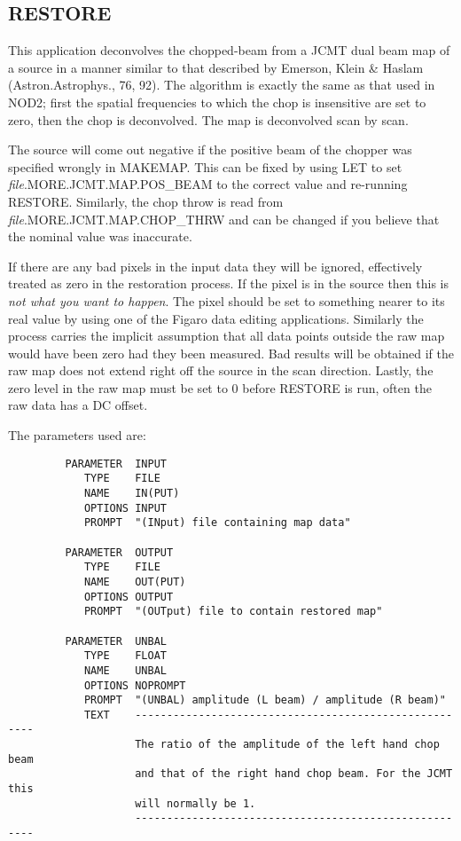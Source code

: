 \subsection{RESTORE}

This application deconvolves the chopped-beam from a JCMT dual  beam
map of a source in a manner similar to that described by  Emerson,
Klein \& Haslam (Astron.Astrophys., 76, 92). The algorithm  is exactly
the same as that used in NOD2; first the spatial  frequencies to which
the chop is insensitive are set to zero,  then the chop is
deconvolved. The map is deconvolved scan by scan.

The source will come out negative if the positive beam of the chopper
was specified wrongly in MAKEMAP. This can be fixed by using LET to
set {\em file}.MORE.JCMT.MAP.POS\_BEAM to the correct value and
re-running RESTORE. Similarly, the chop throw  is read from {\em
file}.MORE.\-JCMT.\-MAP.CHOP\_THRW and can be changed if you  believe that
the nominal value was inaccurate.

If there are any bad pixels in the input data they will be ignored,
effectively treated as zero in the restoration process. If the pixel
is in the source then this is {\em not what you want to happen}. The
pixel should be set to something nearer to its real value by using one
of the Figaro data editing applications. Similarly  the process
carries the implicit assumption that all data points outside the raw
map would have been zero had they been measured. Bad results will be
obtained if the raw map does not extend right off the source in the
scan direction. Lastly, the zero level in the raw map must be set to 0
before RESTORE is run, often the raw data has a DC offset.

The parameters used are:

\begin{small}
\begin{verbatim}
         PARAMETER  INPUT
            TYPE    FILE
            NAME    IN(PUT)
            OPTIONS INPUT
            PROMPT  "(INput) file containing map data"

         PARAMETER  OUTPUT
            TYPE    FILE
            NAME    OUT(PUT)
            OPTIONS OUTPUT
            PROMPT  "(OUTput) file to contain restored map"

         PARAMETER  UNBAL
            TYPE    FLOAT
            NAME    UNBAL
            OPTIONS NOPROMPT
            PROMPT  "(UNBAL) amplitude (L beam) / amplitude (R beam)"
            TEXT    ------------------------------------------------------
                    The ratio of the amplitude of the left hand chop beam
                    and that of the right hand chop beam. For the JCMT this
                    will normally be 1.
                    ------------------------------------------------------
\end{verbatim}
\end{small}

